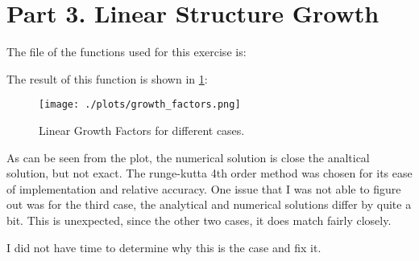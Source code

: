 \section{Part 3. Linear Structure Growth}

The file of the functions used for this exercise is:



The result of this function is shown in \ref{fig:lgf}:

\begin{figure}[h!]
  \centering
  \texttt{[image: ./plots/growth\_factors.png]}
  \caption{Linear Growth Factors for different cases.}
  \label{fig:lgf}
\end{figure}

As can be seen from the plot, the numerical solution is close the analtical solution, but not exact.
The runge-kutta 4th order method was chosen for its ease of implementation and relative accuracy.
One issue that I was not able to figure out was for the third case, the analytical and numerical solutions differ by
quite a bit. This is unexpected, since the other two cases, it does match fairly closely.

I did not have time to determine why this is the case and fix it.